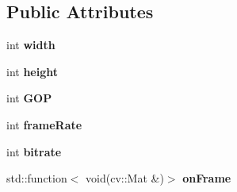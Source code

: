 \subsection*{Public Attributes}
\begin{DoxyCompactItemize}
\item 
\mbox{\label{class_m_e_s_a_i_1_1_f_fmpeg_decoder_a573ebc8ff1e2fdb34d25dc43491ef8f5}} 
int {\bfseries width}
\item 
\mbox{\label{class_m_e_s_a_i_1_1_f_fmpeg_decoder_a21ce7c6c31abdfdcfbb3ec19fcb7b24e}} 
int {\bfseries height}
\item 
\mbox{\label{class_m_e_s_a_i_1_1_f_fmpeg_decoder_ad727d8ba3ca73d9837d703018c335a6c}} 
int {\bfseries G\+OP}
\item 
\mbox{\label{class_m_e_s_a_i_1_1_f_fmpeg_decoder_a59bee3ac056dd0d6c8fdb3c6f6a6b74f}} 
int {\bfseries frame\+Rate}
\item 
\mbox{\label{class_m_e_s_a_i_1_1_f_fmpeg_decoder_a0a06c5a6670dabda8d571f65101a75cd}} 
int {\bfseries bitrate}
\item 
\mbox{\label{class_m_e_s_a_i_1_1_f_fmpeg_decoder_a17913d19b2d877998d7bba9b5801a1ad}} 
std\+::function$<$ void(cv\+::\+Mat \&)$>$ {\bfseries on\+Frame}
\end{DoxyCompactItemize}
